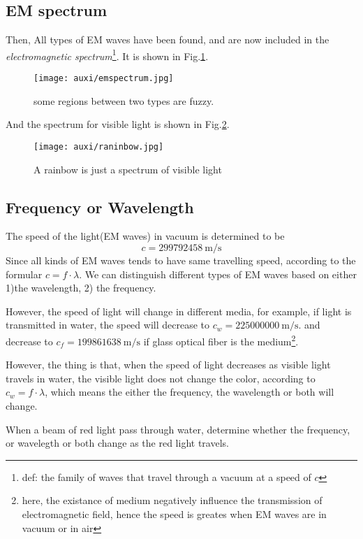 \documentclass[a4paper]{tufte-handout}
\newenvironment{TaskBox} %
{\begin{tcolorbox}[breakable,colback=b1!30,colframe=b1,title=Task]} {\end{tcolorbox}}
\begin{document}
\clearpage


\subsection{EM spectrum}
Then, All types of EM waves have been found, and are now included in the \emph{electromagnetic spectrum}\footnote{def: the family of waves that travel through a vacuum at a speed of $c$}.
It is shown in Fig.\ref{fig:emspectrum}.
\begin{figure}[h]
\texttt{[image: auxi/emspectrum.jpg]}
\caption{some regions between two types are fuzzy.}
\label{fig:emspectrum}
\end{figure}

And the spectrum for visible light is shown in Fig.\ref{fig:rainbow}.
\begin{figure}[h]
\texttt{[image: auxi/raninbow.jpg]}
\caption{A rainbow is just a spectrum of visible light}
\label{fig:rainbow}
\end{figure}


\subsection{Frequency or Wavelength}
The speed of the light(EM waves) in vacuum is determined to be
\[
   c = \SI{299792458}{\m\per\s}
\]
Since all kinds of EM waves tends to have same travelling speed, according to the formular $c=f\cdot \lambda$. We can distinguish different types of EM waves based on either 1)the wavelength, 2) the frequency.

However, the speed of light will change in different media, for example, if light is transmitted in water, the speed will decrease to $c_w=\SI{225000000}{\m\per\s}$. and decrease to $c_f=\SI{199861638}{\m\per\s}$ if glass optical fiber is the medium\footnote{here, the existance of medium negatively influence the transmission of electromagnetic field, hence the speed is greates when EM waves are in vacuum or in air}.

However, the thing is that, when the speed of light decreases as visible light travels in water, the visible light does not change the color, according to $c_w = f\cdot \lambda$, which means the either the frequency, the wavelength or both will change. 
\begin{TaskBox}
When a beam of red light pass through water, determine whether the frequency, or wavelegth or both change as the red light travels.
\tcblower
\vspace{0.5in}
\end{TaskBox}
\end{document}
